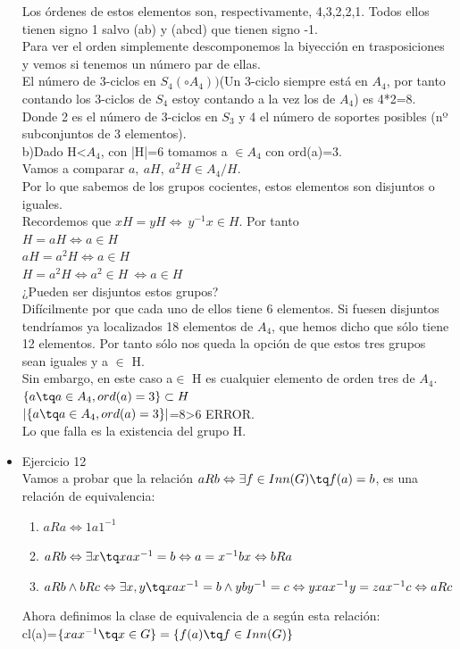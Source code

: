 \documentclass[nochap]{apuntes}
\begin{document}
\begin{itemize}
 Los órdenes de estos elementos son, respectivamente, 4,3,2,2,1. Todos ellos tienen signo 1 salvo (ab) y (abcd) que tienen signo -1.\\
 Para ver el orden simplemente descomponemos la biyección en trasposiciones y vemos si tenemos un número par de ellas.\\
 El número de 3-ciclos en $S_4(\circ A_4))$(Un 3-ciclo siempre está en $A_4$, por tanto contando los 3-ciclos de $S_4$  estoy 
 contando a la vez los de $A_4$) es 4*2=8. Donde 2 es el número de 3-ciclos  en $S_3$  y 4 el número de soportes posibles (nº subconjuntos
 de 3 elementos).\\
 
 b)Dado H<$A_4$, con |H|=6 tomamos a $\in A_4$  con ord(a)=3.\\
 Vamos a comparar $a, \ aH, \ a^{2}H \in A_4/H$. \\
 Por lo que sabemos de los grupos cocientes, estos elementos son disjuntos o iguales.\\
 Recordemos que $xH=yH \Leftrightarrow \ y^{-1}x\in H$.  Por tanto\\
 $H=aH \Leftrightarrow a\in H$\\
 $aH=a^{2}H \Leftrightarrow a\in H$\\
 $H=a^{2}H \Leftrightarrow a^{2}\in H \ \Leftrightarrow a \in H$\\
 
 ¿Pueden ser disjuntos estos grupos? \\Difícilmente por que cada uno de ellos tiene 6 elementos. Si fuesen disjuntos tendríamos ya localizados
 18 elementos de $A_4$, que hemos dicho que sólo tiene 12 elementos. Por tanto sólo nos queda la opción de que estos tres grupos 
 sean iguales y a $\in$ H.\\
 Sin embargo, en este caso a$\in$ H es cualquier elemento de orden tres de $A_4$.\\
 $\{a \tq a \in A_4, ord(a)=3\}\subset H$\\
 $|\{a \tq a \in A_4, ord(a)=3\}|$=8>6 ERROR.\\
 Lo que falla es la existencia del grupo H.
 
 \item Ejercicio 12\\
 Vamos a probar que la relación $aRb \Leftrightarrow \exists f\in Inn(G) \tq f(a)=b$, es una relación de equivalencia:
 \begin{enumerate}
  \item $aRa \Leftrightarrow 1a1^{-1}$
  \item $aRb \Leftrightarrow \exists x \tq xax^{-1}=b \Leftrightarrow a=x^{-1}bx\Leftrightarrow bRa$
  \item $aRb \wedge bRc \Leftrightarrow \exists x,y \tq xax^{-1}=b \wedge yby^{-1}=c \Leftrightarrow yxax^{-1}y=zax^{-1}c \Leftrightarrow aRc$
 \end{enumerate}
 Ahora definimos la clase de equivalencia de a según esta relación:\\
 cl(a)=$\{xax^{-1} \tq x \in G\} = \{f(a) \tq f \in Inn(G)\}$
 

\end{itemize}
\end{document}
